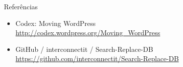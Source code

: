 \documentclass{beamer}
\begin{document}
\begin{frame}{Referências}
\begin{itemize}
  \footnotesize
  \item Codex: Moving WordPress \\
        \url{http://codex.wordpress.org/Moving_WordPress}
  \item GitHub / interconnectit / Search-Replace-DB \\
        \url{https://github.com/interconnectit/Search-Replace-DB}
\end{itemize}
\end{frame}
\end{document}
